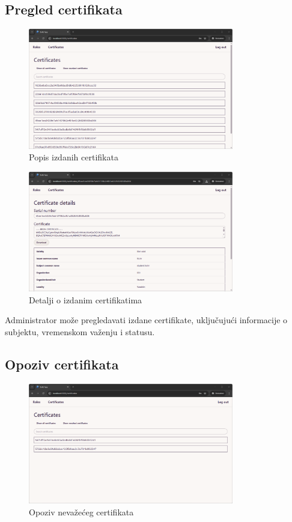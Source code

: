 \documentclass[]{foi}
\begin{document}
\subsection{Pregled certifikata}

\begin{figure}[H]
    \centering
    \includegraphics[width=0.8\textwidth]{assets/certificates.png}
    \caption{Popis izdanih certifikata}
\end{figure}

\begin{figure}[H]
    \centering
    \includegraphics[width=0.8\textwidth]{assets/certificate-details.png}
    \caption{Detalji o izdanim certifikatima}
\end{figure}

Administrator može pregledavati izdane certifikate, uključujući informacije o subjektu, vremenskom važenju i statusu.

\subsection{Opoziv certifikata}

\begin{figure}[H]
    \centering
    \includegraphics[width=0.8\textwidth]{assets/revoked.png}
    \caption{Opoziv nevažećeg certifikata}
\end{figure}
\end{document}
